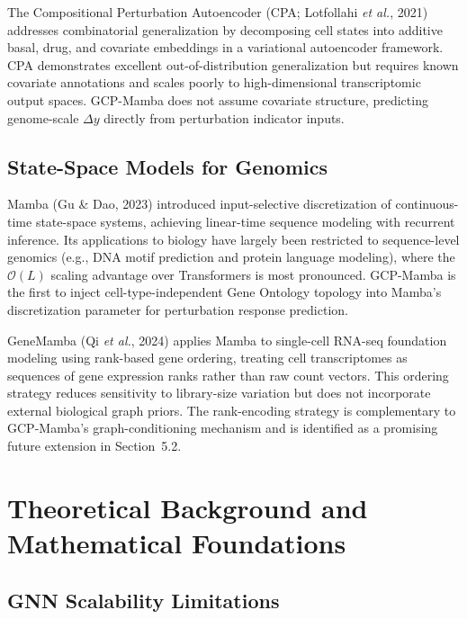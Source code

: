 \documentclass{bioinfo}
\begin{document}
The Compositional Perturbation Autoencoder (CPA; Lotfollahi \textit{et al.}, 2021) addresses combinatorial generalization by decomposing cell states into additive basal, drug, and covariate embeddings in a variational autoencoder framework. CPA demonstrates excellent out-of-distribution generalization but requires known covariate annotations and scales poorly to high-dimensional transcriptomic output spaces. GCP-Mamba does not assume covariate structure, predicting genome-scale $\Delta y$ directly from perturbation indicator inputs.

\subsection{State-Space Models for Genomics}

Mamba (Gu \& Dao, 2023) introduced input-selective discretization of continuous-time state-space systems, achieving linear-time sequence modeling with recurrent inference. Its applications to biology have largely been restricted to sequence-level genomics (e.g., DNA motif prediction and protein language modeling), where the $\mathcal{O}(L)$ scaling advantage over Transformers is most pronounced. GCP-Mamba is the first to inject cell-type-independent Gene Ontology topology into Mamba's discretization parameter for perturbation response prediction.

GeneMamba (Qi \textit{et al.}, 2024) applies Mamba to single-cell RNA-seq foundation modeling using rank-based gene ordering, treating cell transcriptomes as sequences of gene expression ranks rather than raw count vectors. This ordering strategy reduces sensitivity to library-size variation but does not incorporate external biological graph priors. The rank-encoding strategy is complementary to GCP-Mamba's graph-conditioning mechanism and is identified as a promising future extension in Section~5.2.


\section{Theoretical Background and Mathematical Foundations}
\subsection{GNN Scalability Limitations}
\end{document}
